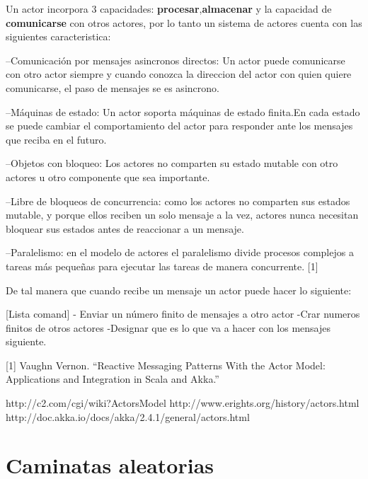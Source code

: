 Un actor  incorpora 3 capacidades: \textbf{procesar},\textbf{almacenar} y   la capacidad de \textbf{comunicarse} con otros actores, por lo tanto un sistema de actores cuenta con las siguientes caracteristica:

--Comunicaci\'on por mensajes asincronos directos: Un actor puede comunicarse con otro actor siempre y cuando conozca la direccion del actor con quien quiere comunicarse, el paso de mensajes se es asincrono.


--M\'aquinas de estado: Un actor soporta m\'aquinas de estado finita.En cada estado  se puede cambiar el comportamiento del actor para responder ante los mensajes que reciba en el futuro.

--Objetos con bloqueo: Los actores no comparten su estado mutable con otro actores u otro componente que sea importante.

--Libre de bloqueos de concurrencia: como los actores no comparten sus estados mutable, y porque ellos reciben un solo mensaje a la vez, actores nunca necesitan bloquear sus estados antes de reaccionar a un mensaje.

--Paralelismo: en el modelo de actores el paralelismo divide procesos complejos a tareas m\'as peque\~nas para ejecutar las tareas de manera concurrente. [1]



De tal manera que cuando recibe un mensaje un actor  puede hacer lo siguiente:

[Lista  comand]
- Enviar un n\'umero finito de mensajes a otro actor
-Crar numeros finitos de otros actores
-Designar  que es lo que  va a hacer con los mensajes siguiente.



[1] Vaughn Vernon. “Reactive Messaging Patterns With the Actor Model: Applications and Integration in Scala and Akka.”

http://c2.com/cgi/wiki?ActorsModel
http://www.erights.org/history/actors.html
http://doc.akka.io/docs/akka/2.4.1/general/actors.html

\section {Caminatas aleatorias}
